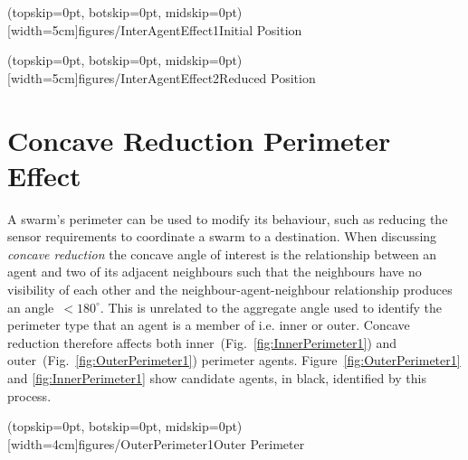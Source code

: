 \documentclass{ieeeaccess}
\begin{document}
\Figure[t!](topskip=0pt, botskip=0pt, midskip=0pt)[width=5cm]{figures/InterAgentEffect1}{Initial Position\label{fig:InterAgentEffect1}}

\Figure[t!](topskip=0pt, botskip=0pt, midskip=0pt)[width=5cm]{figures/InterAgentEffect2}{Reduced Position\label{fig:InterAgentEffect2}}

\section{Concave Reduction Perimeter Effect}\label{sec:ConcaveReductionPerimeterEffect}
A swarm's perimeter can be used to modify its behaviour, such as reducing the sensor requirements to coordinate a swarm to a destination. When discussing \textit{concave reduction} the concave angle of interest is the relationship between an agent and two of its adjacent neighbours such that the neighbours have no visibility of each other and the neighbour-agent-neighbour relationship produces an angle~$< 180^\circ$. This is unrelated to the aggregate angle used to identify the perimeter type that an agent is a member of i.e. inner or outer. Concave reduction therefore affects both inner~(Fig.~\ref{fig:InnerPerimeter1}) and outer~(Fig.~\ref{fig:OuterPerimeter1}) perimeter agents. Figure~\ref{fig:OuterPerimeter1} and \ref{fig:InnerPerimeter1} show candidate agents, in black, identified by this process. 

\Figure[t!](topskip=0pt, botskip=0pt, midskip=0pt)[width=4cm]{figures/OuterPerimeter1}{Outer Perimeter\label{fig:OuterPerimeter1}}
\end{document}
